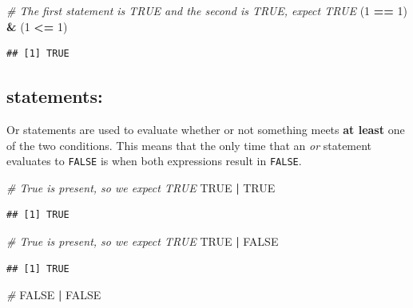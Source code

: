 \documentclass[
]{book}
\newenvironment{Shaded}{\begin{snugshade}}{\end{snugshade}}
\newcommand{\CommentTok}[1]{\textcolor[rgb]{0.56,0.35,0.01}{\textit{#1}}}
\newcommand{\DecValTok}[1]{\textcolor[rgb]{0.00,0.00,0.81}{#1}}
\newcommand{\NormalTok}[1]{#1}
\newcommand{\OperatorTok}[1]{\textcolor[rgb]{0.81,0.36,0.00}{\textbf{#1}}}
\newcommand{\OtherTok}[1]{\textcolor[rgb]{0.56,0.35,0.01}{#1}}
\newcommand{\StringTok}[1]{\textcolor[rgb]{0.31,0.60,0.02}{#1}}
\begin{document}
\begin{Shaded}
\begin{Highlighting}[]
\CommentTok{\# The first statement is TRUE and the second is TRUE, expect TRUE}
\NormalTok{(}\DecValTok{1} \OperatorTok{==}\StringTok{ }\DecValTok{1}\NormalTok{) }\OperatorTok{\&}\StringTok{ }\NormalTok{(}\DecValTok{1} \OperatorTok{\textless{}=}\StringTok{ }\DecValTok{1}\NormalTok{)}
\end{Highlighting}
\end{Shaded}

\begin{verbatim}
## [1] TRUE
\end{verbatim}

\hypertarget{statements-1}{%
\subsection{\texorpdfstring{\texttt{\textbar{}} statements:}{\textbar{} statements:}}\label{statements-1}}

Or statements are used to evaluate whether or not something meets \textbf{at least} one of the two conditions. This means that the only time that an \emph{or} statement evaluates to \texttt{FALSE} is when both expressions result in \texttt{FALSE}.

\begin{Shaded}
\begin{Highlighting}[]
\CommentTok{\# True is present, so we expect TRUE}
\OtherTok{TRUE} \OperatorTok{|}\StringTok{ }\OtherTok{TRUE}
\end{Highlighting}
\end{Shaded}

\begin{verbatim}
## [1] TRUE
\end{verbatim}

\begin{Shaded}
\begin{Highlighting}[]
\CommentTok{\# True is present, so we expect TRUE}
\OtherTok{TRUE} \OperatorTok{|}\StringTok{ }\OtherTok{FALSE}
\end{Highlighting}
\end{Shaded}

\begin{verbatim}
## [1] TRUE
\end{verbatim}

\begin{Shaded}
\begin{Highlighting}[]
\CommentTok{\# }
\OtherTok{FALSE} \OperatorTok{|}\StringTok{ }\OtherTok{FALSE}
\end{Highlighting}
\end{Shaded}
\end{document}
